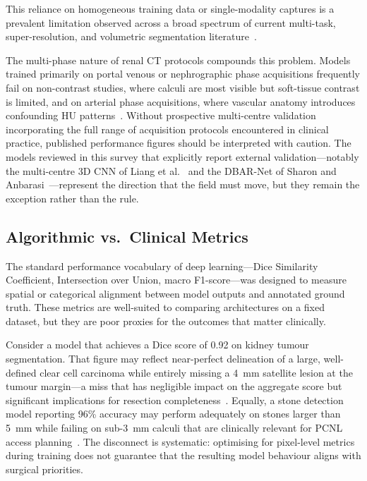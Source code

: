 This reliance on homogeneous training data or single-modality captures is a prevalent limitation observed across a broad spectrum of current multi-task, super-resolution, and volumetric segmentation literature~\cite{abdalla2025axial, ma2022flare, macin2025kidneynext, xie2020seru, nguyen2025super, gao2026multitask, chen2023glunet, sherryl2022ied}.

The multi-phase nature of renal CT protocols compounds this problem. Models trained primarily on portal venous or nephrographic phase acquisitions frequently fail on non-contrast studies, where calculi are most visible but soft-tissue contrast is limited, and on arterial phase acquisitions, where vascular anatomy introduces confounding HU patterns~\cite{liang2025multicenter, ye2026automated}. Without prospective multi-centre validation incorporating the full range of acquisition protocols encountered in clinical practice, published performance figures should be interpreted with caution. The models reviewed in this survey that explicitly report external validation---notably the multi-centre 3D CNN of Liang et al.~\cite{liang2025multicenter} and the DBAR-Net of Sharon and Anbarasi~\cite{sharon2025attention}---represent the direction that the field must move, but they remain the exception rather than the rule.

\subsection{Algorithmic vs.\ Clinical Metrics}
\label{subsec:metrics_gap}

The standard performance vocabulary of deep learning---Dice Similarity Coefficient, Intersection over Union, macro F1-score---was designed to measure spatial or categorical alignment between model outputs and annotated ground truth. These metrics are well-suited to comparing architectures on a fixed dataset, but they are poor proxies for the outcomes that matter clinically.

Consider a model that achieves a Dice score of 0.92 on kidney tumour segmentation. That figure may reflect near-perfect delineation of a large, well-defined clear cell carcinoma while entirely missing a 4~mm satellite lesion at the tumour margin---a miss that has negligible impact on the aggregate score but significant implications for resection completeness~\cite{raj2022deep, gohil2024kidney}. Equally, a stone detection model reporting 96\% accuracy may perform adequately on stones larger than 5~mm while failing on sub-3~mm calculi that are clinically relevant for PCNL access planning~\cite{ye2026automated}. The disconnect is systematic: optimising for pixel-level metrics during training does not guarantee that the resulting model behaviour aligns with surgical priorities.

